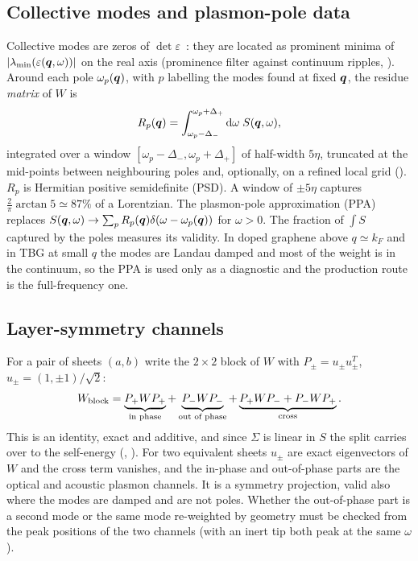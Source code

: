 \subsection{Collective modes and plasmon-pole data}
\label{sec:ppa}

Collective modes are zeros of $\det\varepsilon$~\cite{GiulianiVignale}: they are located as prominent minima of $|\lambda_{\min}(\varepsilon(\bm q,\omega))|$
on the real axis (prominence filter against continuum ripples, ). Around each
pole $\omega_p(\bm q)$, with $p$ labelling the modes found at fixed $\bm q$, the residue \emph{matrix} of $W$ is
\begin{equation}
R_p(\bm q)=\int_{\omega_p-\Delta_-}^{\omega_p+\Delta_+}\mathrm d\omega\;S(\bm q,\omega),
\label{eq:residue}
\end{equation}
integrated over a window $[\omega_p-\Delta_-,\omega_p+\Delta_+]$ of half-width $5\eta$, truncated at the mid-points between
neighbouring poles and, optionally,
on a refined local grid (). $R_p$ is Hermitian
positive semidefinite (PSD). A window of $\pm5\eta$ captures $\frac{2}{\pi}\arctan5\simeq87\%$ of a Lorentzian. The plasmon-pole
approximation (PPA) replaces $S(\bm q,\omega)\to\sum_pR_p(\bm q)\delta(\omega-\omega_p(\bm q))$ for $\omega>0$. The
fraction of $\int S$ captured by the poles measures its validity. In doped graphene above $q\simeq k_F$ and
in TBG at small $q$ the modes are Landau damped and most of the weight is in the continuum, so the PPA is
used only as a diagnostic and the production route is the full-frequency one.

\subsection{Layer-symmetry channels}
\label{sec:channels}

For a pair of sheets $(a,b)$ write the $2\times2$ block of $W$ with $P_\pm=u_\pm u_\pm^T$,
$u_\pm=(1,\pm1)/\sqrt2$:
\begin{equation}
W_{\rm block}=\underbrace{P_+WP_+}_{\text{in phase}}+\underbrace{P_-WP_-}_{\text{out of phase}}
+\underbrace{P_+WP_-+P_-WP_+}_{\text{cross}} .
\label{eq:channels}
\end{equation}
This is an identity, exact and additive, and since $\Sigma$ is linear in $S$ the split carries over to the
self-energy (, ).
For two equivalent sheets $u_\pm$ are exact eigenvectors of $W$ and the cross term vanishes, and the in-phase and
out-of-phase parts are the optical and acoustic plasmon channels. It is a symmetry projection, valid also where
the modes are damped and are not poles. Whether the out-of-phase part is a second mode or the same mode
re-weighted by geometry must be checked from the peak positions of the two channels (with an inert tip both
peak at the same $\omega$).

